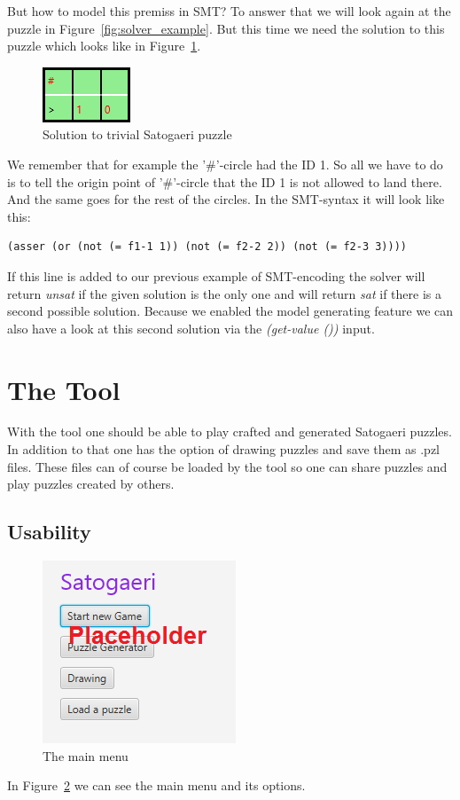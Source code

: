 But how to model this premiss in SMT? To answer that we will look again at the puzzle in Figure~\ref{fig:solver_example}. But this time we need the solution to this puzzle which looks like in Figure~\ref{fig:solver_example_solution}.
\begin{figure}
  \centering
  \includegraphics[scale=1]{Pictures/solver_example_solution.png} 
  \caption{Solution to trivial Satogaeri puzzle}
  \label{fig:solver_example_solution}
\end{figure}
We remember that for example the '\#'-circle had the ID 1. So all we have to do is to tell the origin point of '\#'-circle that the ID 1 is not allowed to land there. And the same goes for the rest of the circles. In the SMT-syntax it will look like this:
\begin{lstlisting}
(asser (or (not (= f1-1 1)) (not (= f2-2 2)) (not (= f2-3 3))))
\end{lstlisting}
If this line is added to our previous example of SMT-encoding the solver will return \emph{unsat} if the given solution is the only one and will return \emph{sat} if there is a second possible solution. Because we enabled the model generating feature we can also have a look at this second solution via the \emph{(get-value ())} input.

\section{The Tool} \label{The Tool}
With the tool one should be able to play crafted and generated Satogaeri puzzles. In addition to that one has the option of drawing puzzles and save them as .pzl files. These files can of course be loaded by the tool so one can share puzzles and play puzzles created by others.

\subsection{Usability}
\begin{figure}
  \centering
  \includegraphics[scale=1]{Pictures/main_menu.png} 
  \caption{The main menu}
  \label{fig:main_menu}
\end{figure}
In Figure~\ref{fig:main_menu} we can see the main menu and its options.

